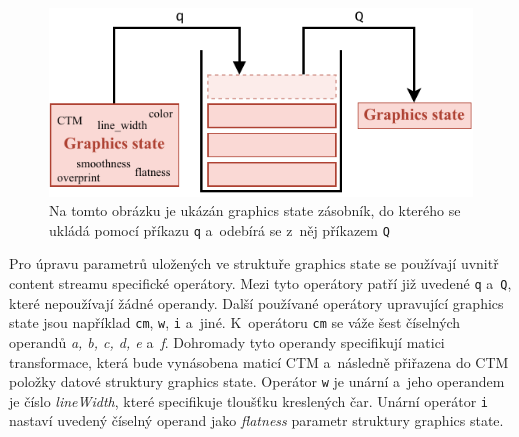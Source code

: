 \begin{figure}[H]
    \centering
    \includegraphics[width=0.7\linewidth]{obrazky-figures/graphics_state_stack.pdf}
    \caption{
        Na tomto obrázku je ukázán graphics state zásobník, do kterého se ukládá
        pomocí příkazu \texttt{q} a~odebírá se z~něj příkazem \texttt{Q}
    }
    \label{pic_graphics_state}
\end{figure}

Pro úpravu parametrů uložených ve struktuře graphics state se používají uvnitř
content streamu specifické operátory. Mezi tyto operátory patří již uvedené
\texttt{q} a~\texttt{Q}, které nepoužívají žádné operandy. Další používané
operátory upravující graphics state jsou například \texttt{cm}, \texttt{w},
\texttt{i} a~jiné. K~operátoru \texttt{cm} se váže šest číselných operandů
\emph{a, b, c, d, e} a~\emph{f}. Dohromady tyto operandy specifikují matici
transformace, která bude vynásobena maticí CTM a~následně přiřazena do CTM položky
datové struktury graphics state. Operátor \texttt{w} je unární a~jeho operandem
je číslo \emph{lineWidth}, které specifikuje tloušťku kreslených čar. Unární
operátor \texttt{i} nastaví uvedený číselný operand jako \emph{flatness} parametr
struktury graphics state.



